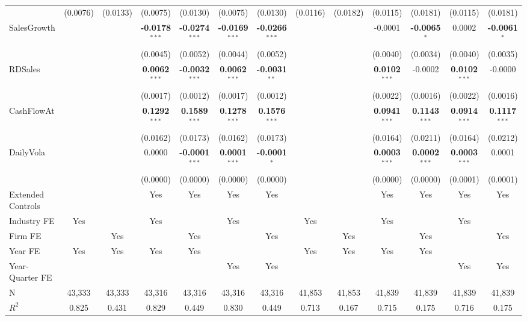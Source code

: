 \documentclass[11pt,a4paper]{article}
\begin{document}
\begin{table}[htbp]
\begin{tabular}{lcccccccccccc}
 & (0.0076) & (0.0133) & (0.0075) & (0.0130) & (0.0075) & (0.0130) & (0.0116) & (0.0182) & (0.0115) & (0.0181) & (0.0115) & (0.0181) \\
SalesGrowth &  &  & \textbf{-0.0178}$^{***}$ & \textbf{-0.0274}$^{***}$ & \textbf{-0.0169}$^{***}$ & \textbf{-0.0266}$^{***}$ &  &  & -0.0001 & \textbf{-0.0065}$^{*}$ & 0.0002 & \textbf{-0.0061}$^{*}$ \\
 &  &  & (0.0045) & (0.0052) & (0.0044) & (0.0052) &  &  & (0.0040) & (0.0034) & (0.0040) & (0.0035) \\
RDSales &  &  & \textbf{0.0062}$^{***}$ & \textbf{-0.0032}$^{***}$ & \textbf{0.0062}$^{***}$ & \textbf{-0.0031}$^{**}$ &  &  & \textbf{0.0102}$^{***}$ & -0.0002 & \textbf{0.0102}$^{***}$ & -0.0000 \\
 &  &  & (0.0017) & (0.0012) & (0.0017) & (0.0012) &  &  & (0.0022) & (0.0016) & (0.0022) & (0.0016) \\
CashFlowAt &  &  & \textbf{0.1292}$^{***}$ & \textbf{0.1589}$^{***}$ & \textbf{0.1278}$^{***}$ & \textbf{0.1576}$^{***}$ &  &  & \textbf{0.0941}$^{***}$ & \textbf{0.1143}$^{***}$ & \textbf{0.0914}$^{***}$ & \textbf{0.1117}$^{***}$ \\
 &  &  & (0.0162) & (0.0173) & (0.0162) & (0.0173) &  &  & (0.0164) & (0.0211) & (0.0164) & (0.0212) \\
DailyVola &  &  & 0.0000 & \textbf{-0.0001}$^{***}$ & \textbf{0.0001}$^{***}$ & \textbf{-0.0001}$^{*}$ &  &  & \textbf{0.0003}$^{***}$ & \textbf{0.0002}$^{***}$ & \textbf{0.0003}$^{***}$ & 0.0001 \\
 &  &  & (0.0000) & (0.0000) & (0.0000) & (0.0000) &  &  & (0.0000) & (0.0000) & (0.0001) & (0.0001) \\
\midrule
Extended Controls &  &  & Yes & Yes & Yes & Yes &  &  & Yes & Yes & Yes & Yes \\
Industry FE & Yes &  & Yes &  & Yes &  & Yes &  & Yes &  & Yes &  \\
Firm FE &  & Yes &  & Yes &  & Yes &  & Yes &  & Yes &  & Yes \\
Year FE & Yes & Yes & Yes & Yes &  &  & Yes & Yes & Yes & Yes &  &  \\
Year-Quarter FE &  &  &  &  & Yes & Yes &  &  &  &  & Yes & Yes \\
\midrule
N & 43,333 & 43,333 & 43,316 & 43,316 & 43,316 & 43,316 & 41,853 & 41,853 & 41,839 & 41,839 & 41,839 & 41,839 \\
$R^2$ & 0.825 & 0.431 & 0.829 & 0.449 & 0.830 & 0.449 & 0.713 & 0.167 & 0.715 & 0.175 & 0.716 & 0.175 \\

\end{tabular}
\end{table}
\end{document}
